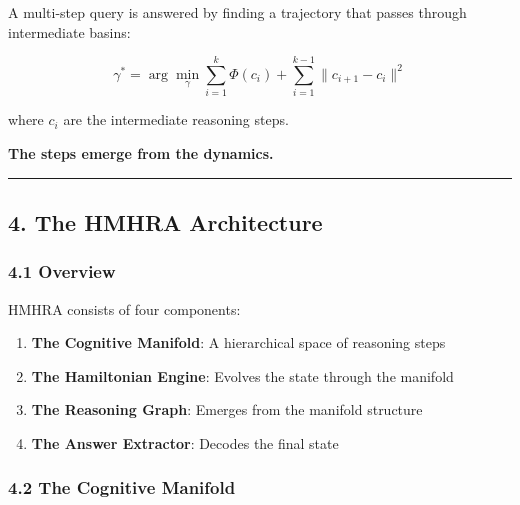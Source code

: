 \documentclass[
  11pt,
  a4paper,
]{article}
\providecommand{\tightlist}{%
  \setlength{\itemsep}{0pt}\setlength{\parskip}{0pt}}
\begin{document}
A multi-step query is answered by finding a trajectory that passes
through intermediate basins:

\[
\gamma^* = \arg\min_{\gamma} \sum_{i=1}^{k} \Phi(c_i) + \sum_{i=1}^{k-1} \|c_{i+1} - c_i\|^2
\]

where \(c_i\) are the intermediate reasoning steps.

\textbf{The steps emerge from the dynamics.}

\begin{center}\rule{0.5\linewidth}{0.5pt}\end{center}

\subsection{4. The HMHRA Architecture}\label{the-hmhra-architecture}

\subsubsection{4.1 Overview}\label{overview}

HMHRA consists of four components:

\begin{enumerate}
\def\labelenumi{\arabic{enumi}.}
\tightlist
\item
  \textbf{The Cognitive Manifold}: A hierarchical space of reasoning
  steps
\item
  \textbf{The Hamiltonian Engine}: Evolves the state through the
  manifold
\item
  \textbf{The Reasoning Graph}: Emerges from the manifold structure
\item
  \textbf{The Answer Extractor}: Decodes the final state
\end{enumerate}

\subsubsection{4.2 The Cognitive Manifold}\label{the-cognitive-manifold}
\end{document}
